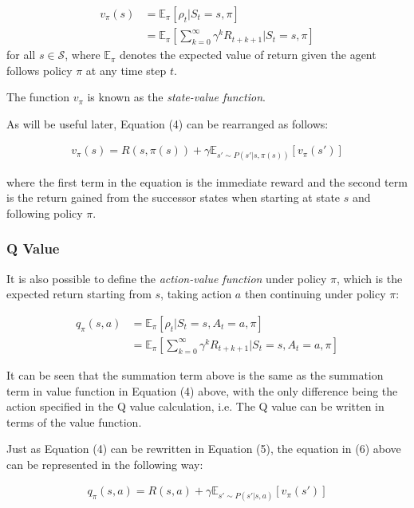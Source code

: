 \documentclass{article}
\begin{document}
\begin{align}
    v_\pi(s) &= \mathbb{E}_\pi [\rho_t | S_t = s, \pi]  \nonumber\\
             &= \mathbb{E}_\pi \left[\sum_{k=0}^{\infty} \gamma ^k R_{t+k+1}| S_t = s, \pi\right]
\end{align}
for all $s \in \mathcal{S}$, where $\mathbb{E}_\pi$ denotes the expected value of return given the agent follows policy $\pi$ at any time step $t$. 

The function $v_\pi$ is known as the \textit{state-value function}.

As will be useful later, Equation (4) can be rearranged as follows\cite{UCBSlides}: 

\begin{align}
    v_\pi(s) = R(s, \pi(s)) + \gamma \mathbb{E}_{s' \sim P(s'|s, \pi(s))} \left[ v_\pi(s')\right]
\end{align}

where the first term in the equation is the immediate reward and the second term is the return gained from the successor states when starting at state $s$ and following policy $\pi$.

\subsubsection{Q Value}

It is also possible to define the \textit{action-value function} under policy $\pi$, which is the expected return starting from $s$, taking action $a$ then continuing under policy $\pi$\cite{RLNotes}\cite{Sutton1998}:

\begin{align}
    q_\pi(s, a) &= \mathbb{E}_\pi [\rho_t | S_t = s, A_t = a, \pi]  \nonumber\\
                &= \mathbb{E}_\pi \left[\sum_{k=0}^{\infty} \gamma ^k R_{t+k+1}| S_t = s, A_t = a, \pi\right]
\end{align}

It can be seen that the summation term above is the same as the summation term in value function in Equation (4) above, with the only difference being the action specified in the Q value calculation, i.e. The Q value can be written in terms of the value function. 

Just as Equation (4) can be rewritten in Equation (5), the equation in (6) above can be represented in the following way\cite{UCBSlides}: 

\begin{align}
    q_\pi(s,a) = R(s,a) + \gamma \mathbb{E}_{s' \sim P(s'|s, a)} \left[ v_\pi(s')\right]
\end{align}
\end{document}
